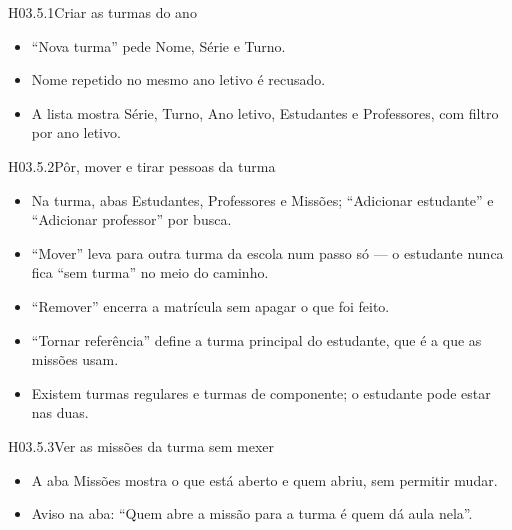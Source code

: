 
\begin{historia}{H03.5.1}{Criar as turmas do ano}{\pronto}
\aceite
\begin{itemize}
  \item \enquote{Nova turma} pede Nome, Série e Turno.
  \item Nome repetido no mesmo ano letivo é recusado.
  \item A lista mostra Série, Turno, Ano letivo, Estudantes e Professores, com
    filtro por ano letivo.
\end{itemize}
\end{historia}

\begin{historia}{H03.5.2}{Pôr, mover e tirar pessoas da turma}{\pronto}
\aceite
\begin{itemize}
  \item Na turma, abas Estudantes, Professores e Missões;
    \enquote{Adicionar estudante} e \enquote{Adicionar professor} por busca.
  \item \enquote{Mover} leva para outra turma da escola num passo só --- o
    estudante nunca fica \enquote{sem turma} no meio do caminho.
  \item \enquote{Remover} encerra a matrícula sem apagar o que foi feito.
  \item \enquote{Tornar referência} define a turma principal do estudante,
    que é a que as missões usam.
  \item Existem turmas regulares e turmas de componente; o estudante pode estar
    nas duas.
\end{itemize}
\end{historia}

\begin{historia}{H03.5.3}{Ver as missões da turma sem mexer}{\pronto}
\aceite
\begin{itemize}
  \item A aba Missões mostra o que está aberto e quem abriu, sem permitir
    mudar.
  \item Aviso na aba: \enquote{Quem abre a missão para a turma é quem dá aula
    nela}.
\end{itemize}
\end{historia}

